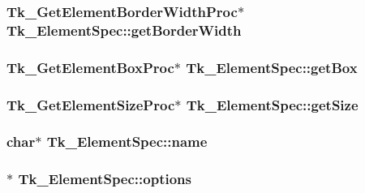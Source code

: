 \subsubsection[{\texorpdfstring{get\+Border\+Width}{getBorderWidth}}]{\setlength{\rightskip}{0pt plus 5cm}Tk\+\_\+\+Get\+Element\+Border\+Width\+Proc$\ast$ Tk\+\_\+\+Element\+Spec\+::get\+Border\+Width}\hypertarget{struct_tk___element_spec_a9df58f19518543330455fef2858b6a30}{}\label{struct_tk___element_spec_a9df58f19518543330455fef2858b6a30}
\subsubsection[{\texorpdfstring{get\+Box}{getBox}}]{\setlength{\rightskip}{0pt plus 5cm}Tk\+\_\+\+Get\+Element\+Box\+Proc$\ast$ Tk\+\_\+\+Element\+Spec\+::get\+Box}\hypertarget{struct_tk___element_spec_a33cfa221f84d6d990caea07ae9855642}{}\label{struct_tk___element_spec_a33cfa221f84d6d990caea07ae9855642}
\subsubsection[{\texorpdfstring{get\+Size}{getSize}}]{\setlength{\rightskip}{0pt plus 5cm}Tk\+\_\+\+Get\+Element\+Size\+Proc$\ast$ Tk\+\_\+\+Element\+Spec\+::get\+Size}\hypertarget{struct_tk___element_spec_a571364fa1ddf1fbff1e895dec371d26e}{}\label{struct_tk___element_spec_a571364fa1ddf1fbff1e895dec371d26e}
\subsubsection[{\texorpdfstring{name}{name}}]{\setlength{\rightskip}{0pt plus 5cm}char$\ast$ Tk\+\_\+\+Element\+Spec\+::name}\hypertarget{struct_tk___element_spec_adc1d733bb6d92bc58bfcf0953f9ffd9d}{}\label{struct_tk___element_spec_adc1d733bb6d92bc58bfcf0953f9ffd9d}
\subsubsection[{\texorpdfstring{options}{options}}]{$\ast$ Tk\+\_\+\+Element\+Spec\+::options}\hypertarget{struct_tk___element_spec_af066011845b070a93c98ac7d3bd09762}{}\label{struct_tk___element_spec_af066011845b070a93c98ac7d3bd09762}

